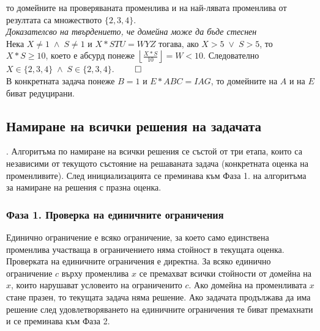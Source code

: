 \documentclass[a4paper, 12pt]{article}
\begin{document}
\begin{itemize}
то домейните на проверяваната променлива и на най-лявата променлива от резултата са множеството \(\{2, 3, 4\}\). \\
\textit{Доказателсво на твърдението, че домейна може да бъде стеснен} \\
Нека \(X \neq 1 \; \land \; S \neq 1\) и \(X * STU = WYZ\) тогава, ако \(X > 5 \; \lor \; S > 5\), то \(X * S \geq 10\),
което е абсурд понеже \(\displaystyle{\left\lfloor\frac{X * S}{10}\right\rfloor} = W < 10\).
Следователно \(X \in \{2, 3, 4\} \; \land \; S \in \{2, 3, 4\}\). \(\qed\) \\
В конкретната задача понеже \(B = 1\) и \(E * ABC = IAG\),
то домейните на \(A\) и на \(E\) биват редуцирани.
\end{itemize}
\subsection{Намиране на всички решения на задачата}.
Алгоритъма по намиране на всички решения се състой от три етапа,
които са независими от текущото състояние на решаваната задача (конкретната оценка на променливите).
След инициализацията се преминава към Фаза 1. на алгоритъма за намиране на решения с празна оценка.
\subsubsection{Фаза 1. Проверка на единичните ограничения}
Единично ограничение е всяко ограничение, за което само единствена променлива участваща в ограничението няма стойност в текущата оценка.
Проверката на единичните ограничения е директна.
За всяко единично ограничение \(c\) върху променлива \(x\) се премахват всички стойности от домейна на \(x\),
които нарушават условеито на ограниченито \(c\).
Ако домейна на променливата \(x\) стане празен, то текущата задача няма решение.
Ако задачата продължава да има решение след удовлетворяването на единичните ограничения те биват премахнати и се преминава към Фаза 2.
\end{document}
